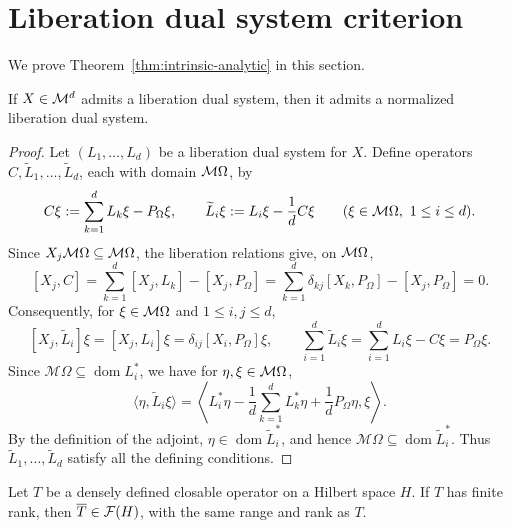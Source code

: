 \section{Liberation dual system criterion}
\label{sec:liberation-dual-system-criterion}

We prove Theorem~\ref{thm:intrinsic-analytic} in this section.

\begin{lemma}\label{lem:liberation-normalization}
If $X\in\mathcal M^d$ admits a liberation dual system, then it admits a normalized liberation dual system.
\end{lemma}
\begin{proof}
Let $(L_1,\ldots,L_d)$ be a liberation dual system for $X$.
Define operators $C,\widetilde L_1,\ldots,\widetilde L_d$, each with domain $\mathcal M\Omega$, by
\[
 C\xi:=\sum_{k=1}^dL_k\xi-P_\Omega\xi,
 \qquad \widetilde L_i\xi:=L_i\xi-\frac1dC\xi
 \qquad(\xi\in\mathcal M\Omega,\ 1\leq i\leq d).
\]
Since $X_j\mathcal M\Omega\subseteq\mathcal M\Omega$, the liberation relations give, on $\mathcal M\Omega$,
\[
 [X_j,C]
 =\sum_{k=1}^d[X_j,L_k]-[X_j,P_\Omega]
 =\sum_{k=1}^d\delta_{kj}[X_k,P_\Omega]-[X_j,P_\Omega]
 =0.
\]
Consequently, for $\xi\in\mathcal M\Omega$ and $1\leq i,j\leq d$,
\[
 [X_j,\widetilde L_i]\xi
 =[X_j,L_i]\xi=\delta_{ij}[X_i,P_\Omega]\xi,
 \qquad
 \sum_{i=1}^d\widetilde L_i\xi
 =\sum_{i=1}^dL_i\xi-C\xi
 =P_\Omega\xi.
\]
Since $\mathcal M\Omega\subseteq\operatorname{dom}L_i^*$, we have for $\eta,\xi\in\mathcal M\Omega$,
\[
 \langle\eta,\widetilde L_i\xi\rangle
 =\left\langle
 L_i^*\eta-\frac1d\sum_{k=1}^dL_k^*\eta+\frac1dP_\Omega\eta,
 \xi\right\rangle.
\]
By the definition of the adjoint, \(\eta\in\operatorname{dom}\widetilde L_i^*\), and hence \(\mathcal M\Omega\subseteq\operatorname{dom}\widetilde L_i^*\).
Thus \(\widetilde L_1,\ldots,\widetilde L_d\) satisfy all the defining conditions.
\end{proof}

\begin{lemma}\label{lem:finite-closure}
Let \(T\) be a densely defined closable operator on a Hilbert space \(H\).
If \(T\) has finite rank, then \(\overline T\in\mathcal F(H)\), with the same range and rank as \(T\).
\end{lemma}

